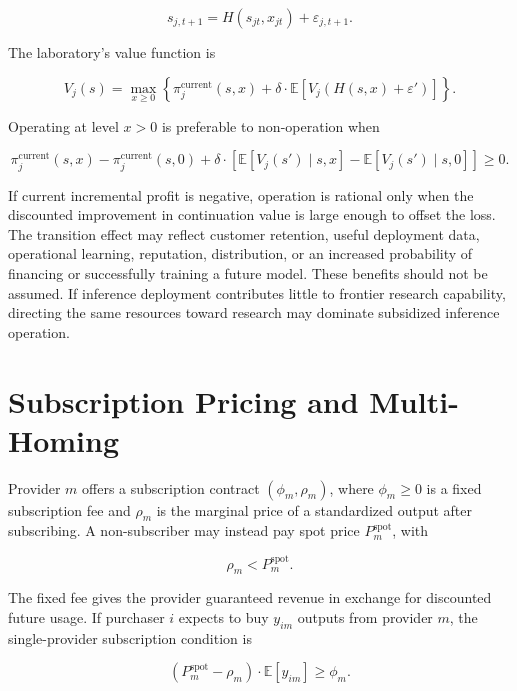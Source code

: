 \documentclass[11pt]{article}
\begin{document}
\begin{equation}s_{j,t+1}=H(s_{jt},x_{jt})+\varepsilon_{j,t+1}.\end{equation}

The laboratory's value function is

\begin{equation}V_j(s)=\max_{x\geq0}\left\{\pi_j^{\mathrm{current}}(s,x)+\delta\cdot\mathbb E\left[V_j\left(H(s,x)+\varepsilon'\right)\right]\right\}.\end{equation}

Operating at level $x>0$ is preferable to non-operation when

\begin{equation}\pi_j^{\mathrm{current}}(s,x)-\pi_j^{\mathrm{current}}(s,0)+\delta\cdot\left[\mathbb E[V_j(s')\mid s,x]-\mathbb E[V_j(s')\mid s,0]\right]\geq0.\end{equation}

If current incremental profit is negative, operation is rational only when the discounted improvement in continuation value is large enough to offset the loss. The transition effect may reflect customer retention, useful deployment data, operational learning, reputation, distribution, or an increased probability of financing or successfully training a future model. These benefits should not be assumed. If inference deployment contributes little to frontier research capability, directing the same resources toward research may dominate subsidized inference operation.

\section{Subscription Pricing and Multi-Homing}
\label{app:subscriptions}

Provider $m$ offers a subscription contract $(\phi_m,\rho_m)$, where $\phi_m\geq0$ is a fixed subscription fee and $\rho_m$ is the marginal price of a standardized output after subscribing. A non-subscriber may instead pay spot price $P_m^{\mathrm{spot}}$, with

\begin{equation}\rho_m<P_m^{\mathrm{spot}}.\end{equation}

The fixed fee gives the provider guaranteed revenue in exchange for discounted future usage. If purchaser $i$ expects to buy $y_{im}$ outputs from provider $m$, the single-provider subscription condition is

\begin{equation}\left(P_m^{\mathrm{spot}}-\rho_m\right)\cdot\mathbb E[y_{im}]\geq\phi_m.\end{equation}
\end{document}
